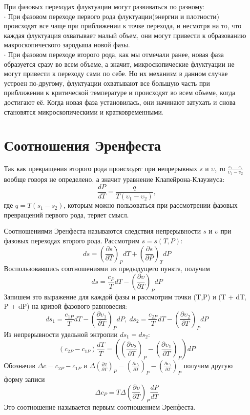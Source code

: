 \documentclass[a4paper,12pt]{article}
\begin{document}
При фазовых переходах флуктуации могут развиваться по разному:\\
$\cdot$ При фазовом переходе первого рода флуктуации(энергии и плотности) происходят все чаще при приближении к точке перехода, и несмотря на то, что каждая флуктуация охватывает малый объем, они могут привести к образованию макроскопического зародыша новой фазы.\\
$\cdot$ При фазовом переходе второго рода, как мы отмечали ранее, новая фаза образуется сразу во всем объеме, а значит, микроскопические флуктуации не могут привести к переходу сами по себе. Но их механизм в данном случае устроен по-другому, флуктуации охватывают все большую часть при приближении к критической температуре и происходят во всем объеме, когда достигают её. Когда новая фаза установилась, они начинают затухать и снова становятся микроскопическими и кратковременными.\\

\newpage
\section{Соотношения Эренфеста}
Так как превращения второго рода происходят при непрерывных $s$ и $\upsilon$, то $\frac{s_1 - s_2}{\upsilon_1 - \upsilon_2}$ вообще говоря не определено, а значит уравнение Клапейрона-Клаузиуса:
\[\frac{dP}{dT} = \frac{q}{T(\upsilon_1 - \upsilon_2)},\]
где $q = T(s_1 - s_2)$, которым можно пользоваться при рассмотрении фазовых превращений первого рода, теряет смысл.

Соотношениями Эренфеста называются следствия непрерывности $s$ и $\upsilon$ при фазовых переходах второго рода. Рассмотрим $s = s(T,P)$:
\[ds = \left(\frac{\partial s}{\partial T}\right)_P dT + \left(\frac{\partial s}{\partial P}\right)_T dP\]
Воспользовавшись соотношениями из предыдущего пункта, получим
\[ds = \frac{c_P}{T}dT - \left(\frac{\partial \upsilon}{\partial T}\right)_P dP\]
Запишем это выражение для каждой фазы и рассмотрим точки (T,P) и (T + dT, P + dP) на кривой фазового равновесия:
\[ds_1 = \frac{c_{1P}}{T}dT - \left(\frac{\partial \upsilon_1}{\partial T}\right)_P dP,\;ds_2 = \frac{c_{2P}}{T}dT - \left(\frac{\partial \upsilon_2}{\partial T}\right)_P dP\]
Из непрерывности удельной энтропии $ds_1 = ds_2$:
\[(c_{2P} - c_{1P})\frac{dT}{T} = \left( \left(\frac{\partial \upsilon_2}{\partial T}\right)_P - \left(\frac{\partial \upsilon_1}{\partial T}\right)_P \right) dP\]
Обозначив $\Delta c = c_{2P} - c_{1P}$ и $\Delta \left( \frac{\partial \upsilon}{\partial T} \right)_P = \left(\frac{\partial \upsilon_2}{\partial T}\right)_P - \left(\frac{\partial \upsilon_1}{\partial T}\right)_P$ получим другую форму записи
\[\Delta c_P = T \Delta \left( \frac{\partial \upsilon}{\partial T} \right)_P \frac{dP}{dT}\]
Это соотношение называется первым соотношением Эренфеста.
\end{document}
